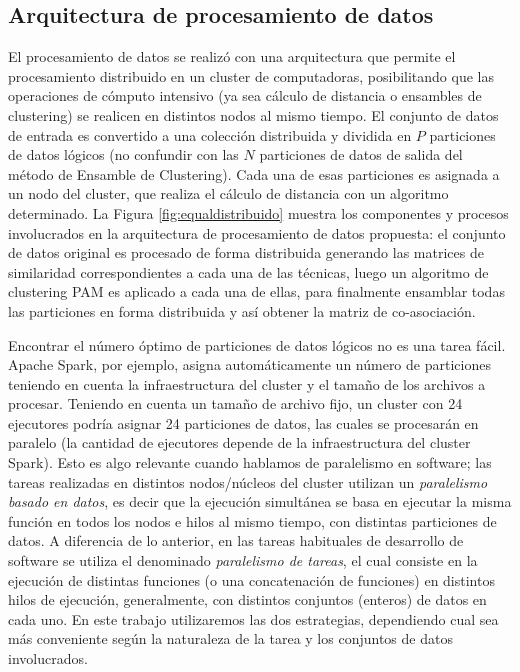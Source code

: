 \subsection{Arquitectura de procesamiento de datos}

El procesamiento de datos se realizó con una arquitectura que permite el procesamiento distribuido en un cluster de computadoras, posibilitando que las operaciones de cómputo intensivo (ya sea cálculo de distancia o ensambles de clustering) se realicen en distintos nodos al mismo tiempo. El conjunto de datos de entrada es convertido a una colección distribuida y dividida en \(P\) particiones de datos lógicos (no confundir con las \(N\) particiones de datos de salida del método de Ensamble de Clustering). Cada una de esas particiones es asignada a un nodo del cluster, que realiza el cálculo de distancia con un algoritmo determinado. La Figura \ref{fig:equaldistribuido} muestra los componentes y procesos involucrados en la arquitectura de procesamiento de datos propuesta: el conjunto de datos original es procesado de forma distribuida generando las matrices de similaridad correspondientes a cada una de las técnicas, luego un algoritmo de clustering PAM es aplicado a cada una de ellas, para finalmente ensamblar todas las particiones en forma distribuida y así obtener la matriz de co-asociación.

\bigskip Encontrar el número óptimo de particiones de datos lógicos no es una tarea fácil. Apache Spark, por ejemplo, asigna automáticamente un número de particiones teniendo en cuenta la infraestructura del cluster y el tamaño de los archivos a procesar. Teniendo en cuenta un tamaño de archivo fijo, un cluster con 24 ejecutores podría asignar 24 particiones de datos, las cuales se procesarán en paralelo (la cantidad de ejecutores depende de la infraestructura del cluster Spark). Esto es algo relevante cuando hablamos de paralelismo en software; las tareas realizadas en distintos nodos/núcleos del cluster utilizan un \textit{paralelismo basado en datos}, es decir que la ejecución simultánea se basa en ejecutar la misma función en todos los nodos e hilos al mismo tiempo, con distintas particiones de datos. A diferencia de lo anterior, en las tareas habituales de desarrollo de software se utiliza el denominado \textit{paralelismo de tareas}, el cual consiste en la ejecución de distintas funciones (o una concatenación de funciones) en distintos hilos de ejecución, generalmente, con distintos conjuntos (enteros) de datos en cada uno. En este trabajo utilizaremos las dos estrategias, dependiendo cual sea más conveniente según la naturaleza de la tarea y los conjuntos de datos involucrados.

